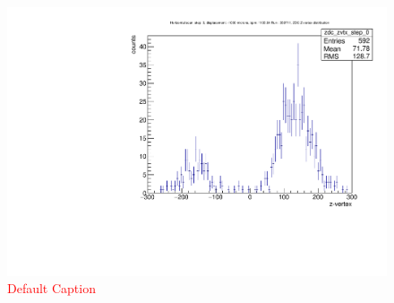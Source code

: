 \begin{figure}
\begin{center}
\includegraphics[width=\linewidth,height=\textheight,keepaspectratio]{../HourglassCorrection/figs/zvertex_profile_hscan_pos_1000_359711}
\caption{ \textcolor{red}{Default Caption} }
\label{fig:zvertex_profile_hscan_pos_1000_359711}
\end{center}
\end{figure}